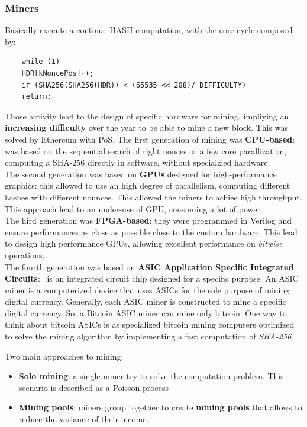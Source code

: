 \documentclass[10pt,a4paper]{report}
\begin{document}
\subsubsection{Miners}\label{sec:miners}
Basically execute a continue HASH computation, with the core cycle composed by:

\begin{lstlisting}
	while (1) 
	HDR[kNoncePos]++; 
	if (SHA256(SHA256(HDR)) < (65535 << 208)/ DIFFICULTY) 
	return;
\end{lstlisting}

Those activity lead to the design of specific hardware for mining, impliying an \textbf{increasing difficulty} over the year to be able to mine a new block. This was solved by Ethereum with PoS.
The first generation of mining was \textbf{CPU-based}: was based on the sequential search of right nonces or a few core parallization, compuitng  a SHA-256 directly in software, without specialzied hardware.\\
The second generation was based on \textbf{GPUs} designed for high-performance graphics: this allowed to use an high degree of parallelism, computing different hashes with different nounces. This allowed the miners to achiee high throughput. This approach lead to an under-use of GPU, consuming a lot of power.\\
The hird generation was \textbf{FPGA-based}: they were programmed in Verilog and ensure performances as close as possible close to the custom hardware. This lead to design high performance GPUs, allowing excellent performance on \textit{bitwise} operations.\\
The fourth generation was based on \textbf{ASIC Application Specific Integrated Circuits}:  is an integrated circuit chip designed for a specific purpose. An ASIC miner is a computerized device that uses ASICs for the sole purpose of mining digital currency. Generally, each ASIC miner is constructed to mine a specific digital currency. So, a Bitcoin ASIC miner can mine only bitcoin. One way to think about bitcoin ASICs is as specialized bitcoin mining computers optimized to solve the mining algorithm by implementing a fast computation of \textit{SHA-256}.

Two main approaches to mining:
\begin{itemize}
	\item 
	\textbf{Solo mining}: a single miner try to solve the computation problem. This scenario is described as a Poisson process
	\item 
	\textbf{Mining pools}: miners group together to create \textbf{mining pools} that allows to reduce the variance of their income.
\end{itemize}
\end{document}
